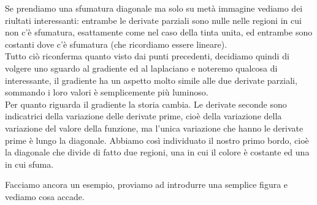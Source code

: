 Se prendiamo una sfumatura diagonale ma solo su metà immagine vediamo dei riultati interessanti: entrambe le derivate parziali sono nulle nelle regioni in cui non c'è sfumatura, esattamente come nel caso della tinta unita, ed entrambe sono costanti dove c'è sfumatura (che ricordiamo essere lineare).\\
Tutto ciò riconferma quanto visto dai punti precedenti, decidiamo quindi di volgere uno sguardo al gradiente ed al laplaciano e noteremo qualcosa di interessante, il gradiente ha un aspetto molto simile alle due derivate parziali, sommando i loro valori è semplicemente più luminoso.\\
Per quanto riguarda il gradiente la storia cambia. Le derivate seconde sono indicatrici della variazione delle derivate prime, cioè della variazione della variazione del valore della funzione, ma l'unica variazione che hanno le derivate prime è lungo la diagonale.
Abbiamo così individuato il nostro primo bordo, cioè la diagonale che divide di fatto due regioni, una in cui il colore è costante ed una in cui sfuma.\\

\vspace{1em}

Facciamo ancora un esempio, proviamo ad introdurre una semplice figura e vediamo cosa accade.\\

